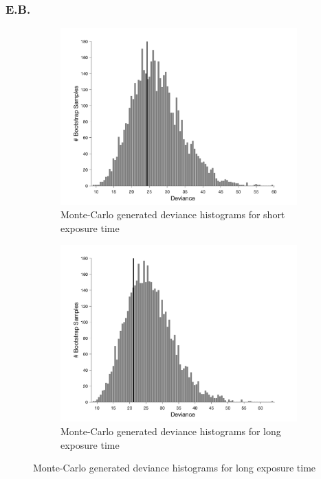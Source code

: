 \documentclass{article}
\begin{document}
\subsubsection*{E.B.}
\begin{figure}[!hb]
    \begin{subfigure}{0.494\textwidth}
        \centering
        \includegraphics[width = \linewidth]{Thesis/plots/gof/segSize/segSize_eb_short_bootstrap.png}
        \caption{Monte-Carlo generated deviance histograms for short exposure time}
        \label{fig:da_gof_short_bootstrap}
    \end{subfigure}
    \hspace{0.01\textwidth}
    \begin{subfigure}{0.494\textwidth}
        \centering
        \includegraphics[width = \linewidth]{Thesis/plots/gof/segSize/segSize_eb_long_bootstrap.png}
        \caption{Monte-Carlo generated deviance histograms for long exposure time}
        \label{fig:da_gof_long_bootstrap}
    \end{subfigure}
    

\end{figure}
\end{document}
